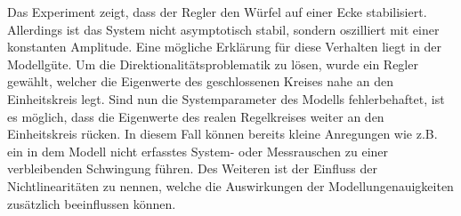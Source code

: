 Das Experiment zeigt, dass der Regler den Würfel auf einer Ecke stabilisiert. Allerdings ist das System nicht asymptotisch stabil, sondern oszilliert mit einer konstanten Amplitude. Eine mögliche Erklärung für diese Verhalten liegt in der Modellgüte. Um die Direktionalitätsproblematik zu lösen, wurde ein Regler gewählt, welcher die Eigenwerte des geschlossenen Kreises nahe an den Einheitskreis legt. Sind nun die Systemparameter des Modells fehlerbehaftet, ist es möglich, dass die Eigenwerte des realen Regelkreises weiter an den Einheitskreis rücken. In diesem Fall können bereits kleine Anregungen wie z.B. ein in dem Modell nicht erfasstes System- oder Messrauschen zu einer verbleibenden Schwingung führen. Des Weiteren ist der Einfluss der Nichtlinearitäten zu nennen, welche die Auswirkungen der Modellungenauigkeiten zusätzlich beeinflussen können. 

